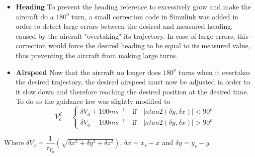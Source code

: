 \begin{itemize}
\item \textbf{Heading} To prevent the heading reference to excessively grow and make the aircraft do a $180^o$ turn, a small correction code in Simulink was added in order to detect large errors between the desired and measured heading, caused by the aircraft "overtaking" its trajectory. In case of large errors, this correction would force the desired heading to be equal to its measured value, thus preventing the aircraft from making large turns. 

\item \textbf{Airspeed} Now that the aircraft no longer does $180^o$ turns when it overtakes the desired trajectory, the desired airspeed must now be adjusted in order to it slow down and therefore reaching the desired position at the desired time. To do so the guidance law was slightly modified to 
\begin{equation}
V_a^d=\begin{cases}
\delta V_a  + 100 ms^{-1} \quad \text{if} \quad |atan2(\delta y,\delta x)|<90^o\\
\delta V_a  - 100 ms^{-1} \quad \text{if} \quad |atan2(\delta y,\delta x)|>90^o
\end{cases}
\end{equation}
\end{itemize}
Where $\delta V_a =  \dfrac{1}{\tau_{V_a}}(\sqrt{\delta x^2 + \delta y^2 + \delta z^2})$, $\delta x = x_r - x$ and $\delta y = y_r - y$.